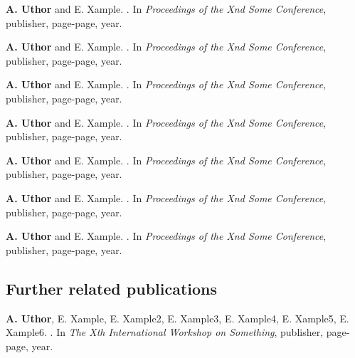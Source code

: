 \documentclass[12pt,a4paper]{extarticle}
\begin{document}
\begin{enumerate}[wide = 0pt, widest = {[4]}, leftmargin =*]

\item[{[3]}] \textbf{A. Uthor} and E. Xample.
.
\newblock In \emph{Proceedings of the Xnd Some Conference}, publisher, page-page, year.
\vspace*{1em}
\item[{[4]}] \textbf{A. Uthor} and E. Xample.
.
\newblock In \emph{Proceedings of the Xnd Some Conference}, publisher, page-page, year.
\vspace*{1em}
\item[{[5]}] \textbf{A. Uthor} and E. Xample.
.
\newblock In \emph{Proceedings of the Xnd Some Conference}, publisher, page-page, year.
\vspace*{1em}
\item[{[6]}] \textbf{A. Uthor} and E. Xample.
.
\newblock In \emph{Proceedings of the Xnd Some Conference}, publisher, page-page, year.
\vspace*{1em}
\item[{[7]}] \textbf{A. Uthor} and E. Xample.
.
\newblock In \emph{Proceedings of the Xnd Some Conference}, publisher, page-page, year.
\vspace*{1em}
\item[{[8]}] \textbf{A. Uthor} and E. Xample.
.
\newblock In \emph{Proceedings of the Xnd Some Conference}, publisher, page-page, year.
\vspace*{1em}
\item[{[9]}] \textbf{A. Uthor} and E. Xample.
.
\newblock In \emph{Proceedings of the Xnd Some Conference}, publisher, page-page, year.
\end{enumerate}

\vspace*{2.00em}

\subsection*{Further related publications}
\vspace*{1em}

\begin{enumerate}[wide = 0pt, widest = {[15]}, leftmargin =*]

\item[{[10]}] \textbf{A. Uthor}, E. Xample, E. Xample2, E. Xample3, E. Xample4, E. Xample5, E. Xample6.
.
\newblock In \emph{The Xth International Workshop on Something}, publisher, page-page, year.

\end{enumerate}
\end{document}
